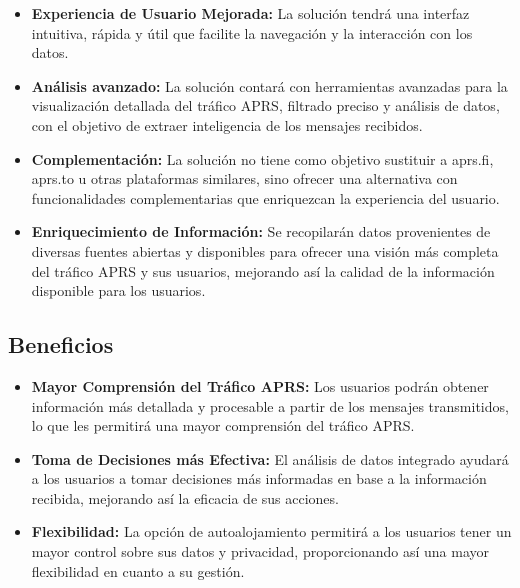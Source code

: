 \begin{itemize}
    \item \textbf{Experiencia de Usuario Mejorada:} La solución tendrá una interfaz intuitiva, rápida y útil que facilite la navegación y la interacción con los datos.
    
    \item \textbf{Análisis avanzado:} La solución contará con herramientas avanzadas para la visualización detallada del tráfico APRS, filtrado preciso y análisis de datos, con el objetivo de extraer inteligencia de los mensajes recibidos.
    
    \item \textbf{Complementación:} La solución no tiene como objetivo sustituir a aprs.fi, aprs.to u otras plataformas similares, sino ofrecer una alternativa con funcionalidades complementarias que enriquezcan la experiencia del usuario.
    
    \item \textbf{Enriquecimiento de Información:} Se recopilarán datos provenientes de diversas fuentes abiertas y disponibles para ofrecer una visión más completa del tráfico APRS y sus usuarios, mejorando así la calidad de la información disponible para los usuarios.
\end{itemize}

\subsection{Beneficios}

\begin{itemize}
    \item \textbf{Mayor Comprensión del Tráfico APRS:} Los usuarios podrán obtener información más detallada y procesable a partir de los mensajes transmitidos, lo que les permitirá una mayor comprensión del tráfico APRS.
    
	\item \textbf{Toma de Decisiones más Efectiva:} El análisis de datos integrado ayudará a los usuarios a tomar decisiones más informadas en base a la información recibida, mejorando así la eficacia de sus acciones.
    
    \item \textbf{Flexibilidad:} La opción de autoalojamiento permitirá a los usuarios tener un mayor control sobre sus datos y privacidad, proporcionando así una mayor flexibilidad en cuanto a su gestión.
\end{itemize}

